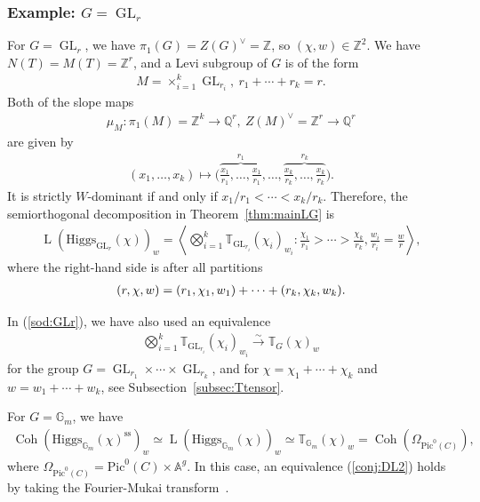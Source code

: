 \documentclass [11pt,oneside,a4paper,mathscr]{amsart}
\theoremstyle{definition}
\newcommand{\LL}{\operatorname{L}}
\newcommand{\Coh}{\operatorname{Coh}}
\newcommand{\GL}{\operatorname{GL}}
\newcommand{\Hig}{\mathrm{Higgs}}
\begin{document}
\subsubsection{Example: $G=\GL_r$}\label{subsubsec:GL}
For $G=\GL_r$, we have $\pi_1(G)=Z(G)^{\vee}=\mathbb{Z}$, so 
$(\chi, w)\in \mathbb{Z}^2$. We have $N(T)=M(T)=\mathbb{Z}^r$, and a Levi subgroup of $G$ is
of the form 
\begin{align*}
    M=\times_{i=1}^k \GL_{r_i}, \ r_1+\cdots+r_k=r.
\end{align*}
Both of the slope maps  
\begin{align*}
    \mu_M \colon \pi_1(M)=\mathbb{Z}^k \to \mathbb{Q}^r, \ Z(M)^{\vee}=\mathbb{Z}^r \to \mathbb{Q}^r
\end{align*}
are given by 
\begin{align*}
(x_1, \ldots, x_k) \mapsto 
    \bigl(\overbrace{\frac{x_1}{r_1}, \ldots, \frac{x_1}{r_1}}^{r_1}, \ldots, \overbrace{\frac{x_k}{r_k}, \ldots, \frac{x_k}{r_k}}^{r_k} \bigr).
    \end{align*}
It is strictly $W$-dominant if and only if $x_1/r_1<\cdots<x_k/r_k$. 
Therefore, the semiorthogonal decomposition in Theorem~\ref{thm:mainLG} is 
\begin{align}\label{sod:GLr}
   \LL(\Hig_{\mathrm{GL}_r}(\chi))_w=\left\langle \bigotimes_{i=1}^k \mathbb{T}_{\mathrm{GL}_{r_i}}(\chi_i)_{w_i} : \frac{\chi_1}{r_1}>\cdots>\frac{\chi_k}{r_k}, \frac{w_i}{r_i}=\frac{w}{r}  \right\rangle,  
\end{align}
where the right-hand side is after all partitions 
\begin{align}\notag
    (r, \chi, w)=(r_1, \chi_1, w_1)+\cdots+(r_k, \chi_k, w_k).
\end{align}

In (\ref{sod:GLr}), we have also used an equivalence 
\begin{align}\label{equiv:Ttensor}
\bigotimes_{i=1}^k \mathbb{T}_{\GL_{r_i}}(\chi_i)_{w_i} \stackrel{\sim}{\to}\mathbb{T}_G(\chi)_w
\end{align}
for the group $G=\GL_{r_1}\times \cdots \times \GL_{r_k}$, and for
$\chi=\chi_1+\cdots+\chi_k$ and $w=w_1+\cdots+w_k$, see Subsection~\ref{subsec:Ttensor}. 

For $G=\mathbb{G}_m$, we have 
\begin{align*}
    \Coh(\Hig_{\mathbb{G}_m}(\chi)^{\mathrm{ss}})_w \simeq 
    \LL(\Hig_{\mathbb{G}_m}(\chi))_w \simeq \mathbb{T}_{\mathbb{G}_m}(\chi)_w=\Coh(\Omega_{\mathrm{Pic}^0(C)}), 
\end{align*}
where $\Omega_{\mathrm{Pic}^0(C)}=\mathrm{Pic}^0(C) \times \mathbb{A}^g$. 
In this case, 
an equivalence (\ref{conj:DL2}) holds by taking the Fourier-Mukai transform~\cite{Mu1}. 
\end{document}
